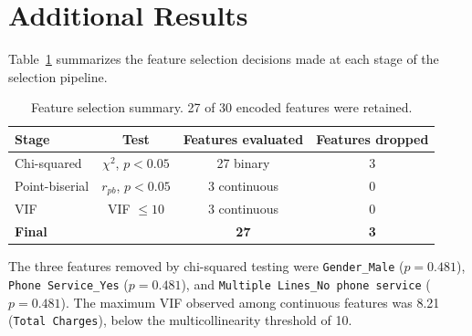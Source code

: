 \documentclass{article}
\begin{document}
\appendix

\section{Additional Results}

Table~\ref{tab:featsel} summarizes the feature selection decisions made at each stage
of the selection pipeline.

\begin{table}[h]
  \caption{Feature selection summary. 27 of 30 encoded features were retained.}
  \label{tab:featsel}
  \centering
  \begin{tabular}{lccc}
    \toprule
    Stage & Test & Features evaluated & Features dropped \\
    \midrule
    Chi-squared      & $\chi^2$, $p < 0.05$     & 27 binary   & 3 \\
    Point-biserial   & $r_{pb}$, $p < 0.05$     & 3 continuous & 0 \\
    VIF              & VIF $\leq 10$            & 3 continuous & 0 \\
    \midrule
    \textbf{Final}   &                           & \textbf{27} & \textbf{3} \\
    \bottomrule
  \end{tabular}
\end{table}

The three features removed by chi-squared testing were \texttt{Gender\_Male}
($p = 0.481$), \texttt{Phone Service\_Yes} ($p = 0.481$), and
\texttt{Multiple Lines\_No phone service} ($p = 0.481$). The maximum VIF observed
among continuous features was 8.21 (\texttt{Total Charges}), below the
multicollinearity threshold of 10.
\end{document}
